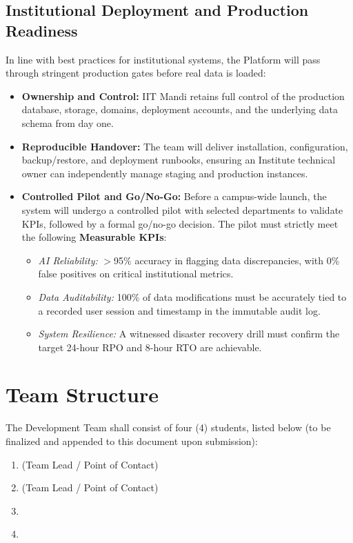 \documentclass[11pt]{article}
\begin{document}
\subsection{Institutional Deployment and Production Readiness}
In line with best practices for institutional systems, the Platform will pass through stringent production gates before real data is loaded:
\begin{itemize}[leftmargin=1.4em, itemsep=3pt]
\item \textbf{Ownership and Control:} IIT Mandi retains full control of the production database, storage, domains, deployment accounts, and the underlying data schema from day one.
\item \textbf{Reproducible Handover:} The team will deliver installation, configuration, backup/restore, and deployment runbooks, ensuring an Institute technical owner can independently manage staging and production instances.
\item \textbf{Controlled Pilot and Go/No-Go:} Before a campus-wide launch, the system will undergo a controlled pilot with selected departments to validate KPIs, followed by a formal go/no-go decision. The pilot must strictly meet the following \textbf{Measurable KPIs}:
  \begin{itemize}[leftmargin=1.4em, itemsep=2pt]
    \item \textit{AI Reliability:} $>$95\% accuracy in flagging data discrepancies, with 0\% false positives on critical institutional metrics.
    \item \textit{Data Auditability:} 100\% of data modifications must be accurately tied to a recorded user session and timestamp in the immutable audit log.
    \item \textit{System Resilience:} A witnessed disaster recovery drill must confirm the target 24-hour RPO and 8-hour RTO are achievable.
  \end{itemize}
\end{itemize}

\section{Team Structure}
The Development Team shall consist of four (4) students, listed below (to be finalized and appended to this document upon submission):

\begin{enumerate}[leftmargin=1.8em, itemsep=4pt]
\item \underline{\hspace{7cm}} (Team Lead / Point of Contact)
\item \underline{\hspace{7cm}} (Team Lead / Point of Contact)
\item \underline{\hspace{7cm}}
\item \underline{\hspace{7cm}}
\end{enumerate}
\end{document}
